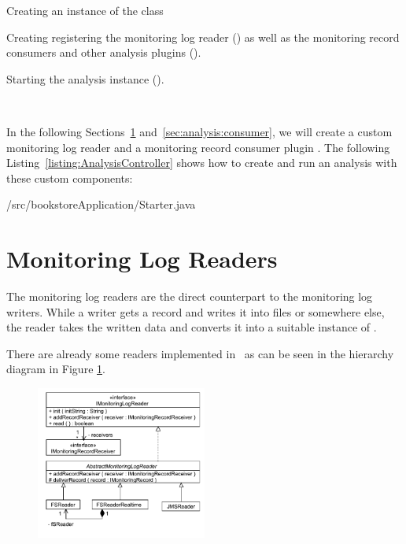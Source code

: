 \begin{compactenum}
\item Creating an instance of the  class
\item Creating registering the monitoring log reader () as %
well as the monitoring record consumers and other analysis plugins ().
\item Starting the analysis instance ().
\end{compactenum}

\

\noindent In the following Sections~\ref{sec:analysis:reader} and~\ref{sec:analysis:consumer}, %
we will create a custom monitoring log reader  and a %
monitoring record consumer plugin . %
\noindent The following Listing~\ref{listing:AnalysisController} shows how to create and run an analysis %
with these custom components:

\setJavaCodeListing
	{\customComponentsBookstoreApplicationDir/src/bookstoreApplication/Starter.java}

\section{Monitoring Log Readers}\label{sec:analysis:reader}

The monitoring log readers are the direct counterpart to the monitoring log writers. While a writer gets a record and writes it into files or somewhere else, the reader takes the written data and converts it into a suitable instance of .

% 
% 

\noindent There are already some readers implemented in \Kieker\  as can be seen in the hierarchy diagram in Figure \ref{Figure:ReaderHierarchy}.

\begin{figure}[H]\centering
\includegraphics[width=0.5\textwidth]{images/kieker_readerimpls}
\caption{}
\label{Figure:ReaderHierarchy}
\end{figure}

